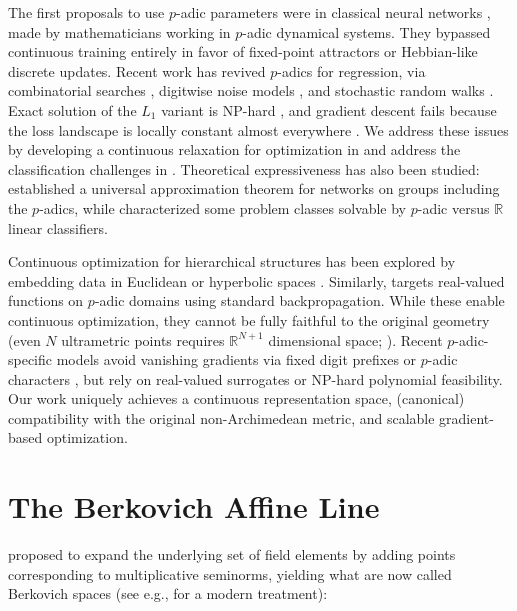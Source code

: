 The first proposals to use $p$-adic parameters were in classical neural networks \citep{albeverio1999padic, khrennikov2000learning}, made by mathematicians working in $p$-adic dynamical systems. They bypassed continuous training entirely in favor of fixed-point attractors or Hebbian-like discrete updates. Recent work has revived $p$-adics for regression, via combinatorial searches \citep{martins2025learning}, digitwise noise models \citep{mihara2026padicpolynomial}, and stochastic random walks \citep{zubarev2025adic}. Exact solution of the $L_1$ variant is NP-hard \citep{baker2026nphardness}, and gradient descent fails because the loss landscape is locally constant almost everywhere \citep{baker2025linear}. We address these issues by developing a continuous relaxation for optimization in  and address the classification challenges in . Theoretical expressiveness has also been studied: \citet{biderman2019neural} established a universal approximation theorem for networks on groups including the $p$-adics, while \citet{martins2025learning} characterized some problem classes solvable by $p$-adic versus $\mathbb{R}$ linear classifiers.

Continuous optimization for hierarchical structures has been explored by embedding data in Euclidean \citep{chierchia2019ultrametric, perret2021component} or hyperbolic spaces \citep{chami2020trees, zeng2025hyperbolic}. Similarly, \citet{zuniga2024deep} targets real-valued functions on $p$-adic domains using standard backpropagation. While these enable continuous optimization, they cannot be fully faithful to the original geometry (even $N$ ultrametric points requires $\mathbb{R}^{N+1}$ dimensional space; \citealp{lemin1985isometric}). Recent $p$-adic-specific models avoid vanishing gradients via fixed digit prefixes \citep{nguessan2025vpunns} or $p$-adic characters \citep{mihara2026padic}, but rely on real-valued surrogates or NP-hard polynomial feasibility. Our work uniquely achieves a continuous representation space, (canonical) compatibility with the original non-Archimedean metric, and scalable gradient-based optimization.

\section{The Berkovich Affine Line}
\label{sec:berkovich}
\citet{berkovich1990spectral} proposed to expand the underlying set of field elements by adding points corresponding to multiplicative seminorms, yielding what are now called Berkovich spaces (see e.g., \citealp{poineau2020berkovich} for a modern treatment):

